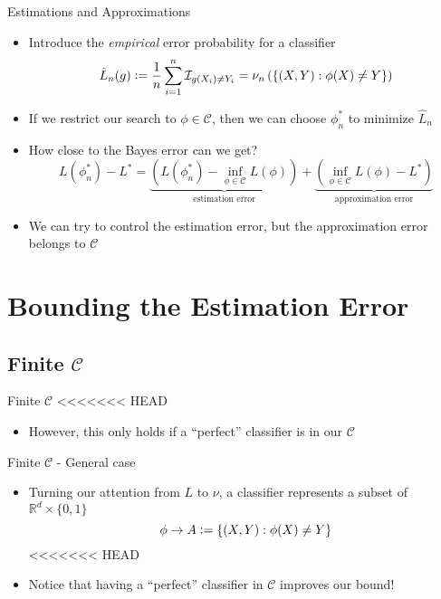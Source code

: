 \documentclass{beamer}
\renewcommand{\Pr}[1]{\mathcal{P} \left( #1 \right)}
\newcommand{\cls}{\mathcal{C}}
\newcommand{\E}[1]{\mathbb{E}\left( #1 \right)}
\newcommand{\R}{\mathbb{R}}
\newcommand{\defeq}{\vcentcolon=}
\newcommand{\pa}[1]{\left( #1 \right)}
\newcommand{\I}{\mathcal{I}}
\newcommand{\abs}[1]{\left| #1 \right|}
\newcommand{\br}[1]{\left\{ #1 \right\} }
\newcommand{\eps}{\varepsilon}
\begin{document}
\begin{frame}{Estimations and Approximations}
\begin{itemize}
\item Introduce the \emph{empirical} error probability for a classifier
\[ \hat{L}_n(g) \defeq \frac1n \sum_{i=1}^n \I_{g(X_i) \ne Y_i} = \nu_n\pa{\br{(X,Y) : \phi(X) \ne Y}}\]
\item If we restrict our search to $\phi \in \cls$, then we can choose $\phi_n^*$ to minimize $\hat{L}_n$
\item How close to the Bayes error can we get?
\[ L(\phi_n^*) - L^* = \underbrace{\pa{ L(\phi_n^*) - \inf_{\phi \in \cls} L(\phi)}}_{\text{estimation error}} + \underbrace{\pa{ \inf_{\phi \in \cls} L(\phi) - L^*}}_{\text{approximation error}} \]
\item We can try to control the estimation error, but the approximation error belongs to $\cls$
\end{itemize}
\end{frame}

\section{Bounding the Estimation Error}
\subsection{Finite $\cls$}
\begin{frame}{Finite $\cls$}
<<<<<<< HEAD
\begin{itemize}
\item However, this only holds if a ``perfect'' classifier is in our $\cls$
\end{itemize}
\end{frame}

\begin{frame}{Finite $\cls$ - General case}
\begin{itemize}
\item Turning our attention from $L$ to $\nu$, a classifier represents a subset of $\R^d \times \{0,1\}$ 
\[ \phi \to A \defeq \br{ (X,Y) : \phi(X) \ne Y}\]
<<<<<<< HEAD
\item Notice that having a ``perfect'' classifier in $\cls$ improves our bound!
\end{itemize}
\end{frame}
\end{document}
